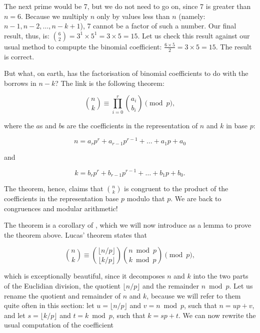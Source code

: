 \documentclass[tikz]{scrreprt}
\begin{document}
The next prime would be 7,
but we do not need to go on,
since 7 is greater than $n=6$.
Because we multiply $n$ only by values
less than $n$ (namely: $n-1,n-2,\dots,n-k+1$),
7 cannot be a factor of such a number.
Our final result, thus, is:
$\binom{6}{2} = 3^1 \times 5^1 = 3 \times 5 = 15$.
Let us check this result against our usual method
to compupte the binomial coefficient:
$\frac{6 \times 5}{2} = 3 \times 5 = 15$.
The result is correct.

But what, on earth, has the factorisation
of binomial coefficients to do with 
the borrows in $n-k$? 
The link is the following theorem:

\begin{equation}
\binom{n}{k} \equiv \prod_{i=0}^{r}{\binom{a_i}{b_i}} \pmod{p},
\end{equation}

where the $a$s and $b$s are the coefficients
in the representation of $n$ and $k$ 
in base $p$:

\begin{equation}
n = a_rp^r + a_{r-1}p^{r-1} + \dots + a_1p + a_0
\end{equation}

and

\begin{equation}
k = b_rp^r + b_{r-1}p^{r-1} + \dots + b_1p + b_0.
\end{equation}

The theorem, hence, claims that
$\binom{n}{k}$ is congruent
to the product of the coefficients
in the representation base $p$ 
modulo that $p$.
We are back to congruences and
modular arithmetic!

The theorem is a corollary of ,
which we will now introduce as a lemma to prove
the theorem above.
Lucas' theorem states that

\begin{equation}\label{eq:lucas1}
\binom{n}{k} \equiv \binom{\lfloor n/p\rfloor}{\lfloor k/p\rfloor}
                    \binom{n \bmod p}{k \bmod p} \pmod{p},
\end{equation}

which is exceptionally beautiful, since
it decomposes $n$ and $k$
into the two parts of the Euclidian division,
the quotient $\lfloor n/p \rfloor$ and
the remainder $n \bmod p$.
Let us rename the quotient and remainder
of $n$ and $k$, because we will refer
to them quite often in this section:
let $u = \lfloor n/p \rfloor$ and
    $v = n \bmod p$, such that
$n = up + v$, and
let $s = \lfloor k/p \rfloor$ and
    $t = k \bmod p$, such that
$k = sp + t$.
We can now rewrite the 
usual computation of the coefficient
\end{document}
